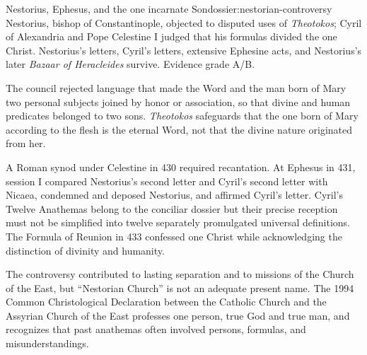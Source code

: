 \begin{heresydossier}{Nestorius, Ephesus, and the one incarnate Son}{dossier:nestorian-controversy}
\objectfield Nestorius, bishop of Constantinople, objected to disputed uses of \emph{Theotokos}; Cyril of Alexandria and Pope Celestine I judged that his formulas divided the one Christ. Nestorius's letters, Cyril's letters, extensive Ephesine acts, and Nestorius's later \emph{Bazaar of Heracleides} survive. Evidence grade A/B.

\propositionfield The council rejected language that made the Word and the man born of Mary two personal subjects joined by honor or association, so that divine and human predicates belonged to two sons. \emph{Theotokos} safeguards that the one born of Mary according to the flesh is the eternal Word, not that the divine nature originated from her.

\responsefield A Roman synod under Celestine in 430 required recantation. At Ephesus in 431, session I compared Nestorius's second letter and Cyril's second letter with Nicaea, condemned and deposed Nestorius, and affirmed Cyril's letter. Cyril's Twelve Anathemas belong to the conciliar dossier but their precise reception must not be simplified into twelve separately promulgated universal definitions. The Formula of Reunion in 433 confessed one Christ while acknowledging the distinction of divinity and humanity.

\aftermathfield The controversy contributed to lasting separation and to missions of the Church of the East, but ``Nestorian Church'' is not an adequate present name. The 1994 Common Christological Declaration between the Catholic Church and the Assyrian Church of the East professes one person, true God and true man, and recognizes that past anathemas often involved persons, formulas, and misunderstandings.
\end{heresydossier}

